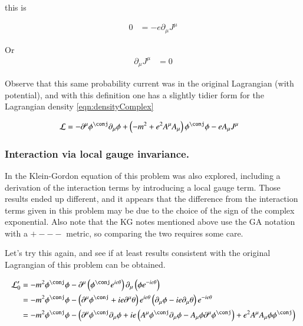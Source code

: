 \documentclass{article}
\begin{document}
this is

\begin{align*}
0 &= - e \partial_\mu J^\mu
\end{align*}

Or 
\begin{align}
\partial_\mu J^\mu &= 0
\end{align}

Observe that this same probability current was in the original Lagrangian (with potential), and with this definition one has a slightly
tidier form for the Lagrangian density \ref{eqn:densityComplex}

\begin{align}\label{eqn:LagrangianWithCurrent}
\LL 
&=
-\partial^\mu \phi^\conj \partial_\mu \phi
+ \left( -m^2 + e^2 A^\mu A_\mu \right) \phi^\conj \phi
- e A_\mu J^\mu 
\end{align}

\subsubsection{ Interaction via local gauge invariance. }

In \cite{PJkgNotes} the Klein-Gordon equation of this problem was also explored, including a derivation of the interaction terms
by introducing a local gauge term.  
Those results ended up different, and it appears that the difference from the
interaction terms given in this problem may be due to the choice of the sign of the complex exponential.
Also note that the KG notes mentioned above use the GA notation with a $+---$ metric,
so comparing the two requires some care.

Let's try this again, and see if at least results consistent with the original Lagrangian of this problem can be obtained.

\begin{align*}
\LL_0' 
&= -m^2 \phi^\conj \phi - 
\partial^\mu \left( \phi^\conj e^{ie\theta} \right) \partial_\mu \left( \phi e^{-ie\theta} \right) \\
&= -m^2 \phi^\conj \phi - 
\left( \partial^\mu \phi^\conj + i e \partial^\mu \theta \right) e^{i e \theta} \left( \partial_\mu \phi - ie \partial_\mu \theta 
\right) 
e^{-ie\theta} 
\\
&= -m^2 \phi^\conj \phi - 
\left( 
\partial^\mu \phi^\conj \partial_\mu \phi 
+ i e \left( A^\mu \phi^\conj \partial_\mu \phi - A_\mu \phi \partial^\mu \phi^\conj \right)
+ e^2 A^\mu A_\mu \phi \phi^\conj
\right) 
\\
\end{align*}
\end{document}
